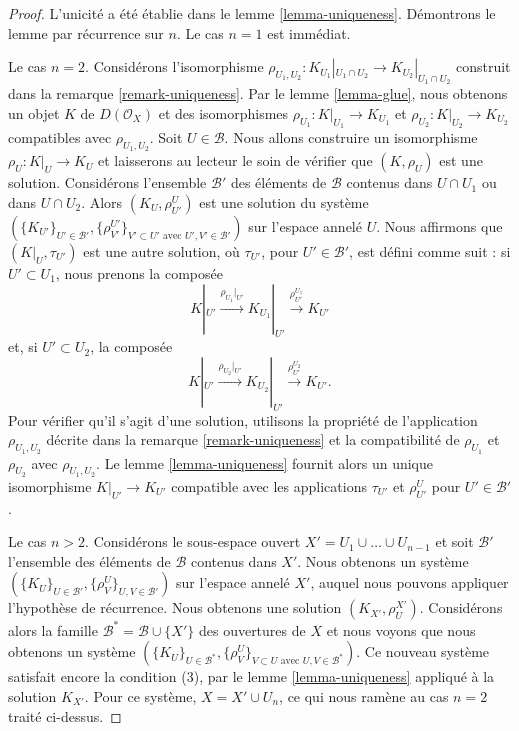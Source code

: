 \begin{proof}
L'unicité a été établie dans le lemme \ref{lemma-uniqueness}. Démontrons le lemme par récurrence sur $n$. Le cas $n = 1$ est immédiat.

\medskip\noindent

Le cas $n = 2$. Considérons l'isomorphisme
$\rho_{U_1, U_2} : K_{U_1}|_{U_1 \cap U_2} \to K_{U_2}|_{U_1 \cap U_2}$
construit dans la remarque \ref{remark-uniqueness}. Par le lemme \ref{lemma-glue}, nous obtenons un objet $K$ de $D(\mathcal{O}_X)$
et des isomorphismes $\rho_{U_1} : K|_{U_1} \to K_{U_1}$ et
$\rho_{U_2} : K|_{U_2} \to K_{U_2}$ compatibles avec $\rho_{U_1, U_2}$. Soit $U \in \mathcal{B}$. Nous allons construire un isomorphisme
$\rho_U : K|_U \to K_U$ et laisserons au lecteur le soin de vérifier que $(K, \rho_U)$ est une solution. Considérons l'ensemble $\mathcal{B}'$
des éléments de $\mathcal{B}$ contenus dans $U \cap U_1$ ou dans
$U \cap U_2$. Alors $(K_U, \rho^U_{U'})$ est une solution du système
$(\{K_{U'}\}_{U' \in \mathcal{B}'},
\{\rho_{V'}^{U'}\}_{V' \subset U'\text{ avec }U', V' \in \mathcal{B}'})$
sur l'espace annelé $U$. Nous affirmons que $(K|_U, \tau_{U'})$ est une autre solution, où
$\tau_{U'}$, pour $U' \in \mathcal{B}'$, est défini comme suit : si $U' \subset U_1$, nous prenons la composée
$$
K|_{U'} \xrightarrow{\rho_{U_1}|_{U'}}
K_{U_1}|_{U'} \xrightarrow{\rho^{U_1}_{U'}}
K_{U'}
$$
et, si $U' \subset U_2$, la composée
$$
K|_{U'} \xrightarrow{\rho_{U_2}|_{U'}}
K_{U_2}|_{U'} \xrightarrow{\rho^{U_2}_{U'}}
K_{U'}.
$$
Pour vérifier qu'il s'agit d'une solution, utilisons la propriété de l'application $\rho_{U_1, U_2}$
décrite dans la remarque \ref{remark-uniqueness} et la compatibilité de
$\rho_{U_1}$ et $\rho_{U_2}$ avec $\rho_{U_1, U_2}$. Le lemme \ref{lemma-uniqueness} fournit alors un unique isomorphisme $K|_{U'} \to K_{U'}$ compatible avec les applications $\tau_{U'}$ et
$\rho^U_{U'}$ pour $U' \in \mathcal{B}'$.

\medskip\noindent

Le cas $n > 2$. Considérons le sous-espace ouvert
$X' = U_1 \cup \ldots \cup U_{n - 1}$ et soit $\mathcal{B}'$ l'ensemble des éléments de $\mathcal{B}$ contenus dans $X'$. Nous obtenons un système
$(\{K_U\}_{U \in \mathcal{B}'}, \{\rho_V^U\}_{U, V \in \mathcal{B}'})$
sur l'espace annelé $X'$, auquel nous pouvons appliquer l'hypothèse de récurrence. Nous obtenons une solution $(K_{X'}, \rho^{X'}_U)$. Considérons alors la famille
$\mathcal{B}^* = \mathcal{B} \cup \{X'\}$ des ouvertures de $X$ et nous voyons que nous obtenons un système
$(\{K_U\}_{U \in \mathcal{B}^*},
\{\rho_V^U\}_{V \subset U\text{ avec }U, V \in \mathcal{B}^*})$. Ce nouveau système satisfait encore la condition (3), par le lemme \ref{lemma-uniqueness} appliqué à la solution $K_{X'}$. Pour ce système, $X = X' \cup U_n$, ce qui nous ramène au cas $n = 2$ traité ci-dessus.

\end{proof}

